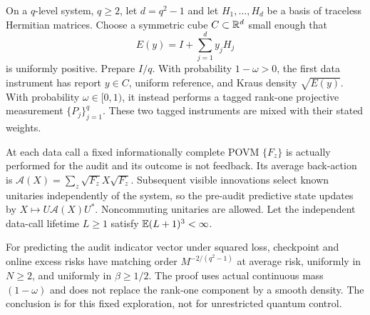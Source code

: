 \begin{theorem}\label{thm:quantum-geometry}
On a $q$-level system, $q\ge2$, let $d=q^2-1$ and let $H_1,\ldots,H_d$ be a basis of traceless Hermitian matrices. Choose a symmetric cube $C\subset\mathbb R^d$ small enough that
\[
 E(y)=I+\sum_{j=1}^dy_jH_j
\]
is uniformly positive. Prepare $I/q$. With probability $1-\omega>0$, the first data instrument has report $y\in C$, uniform reference, and Kraus density $\sqrt{E(y)}$. With probability $\omega\in[0,1)$, it instead performs a tagged rank-one projective measurement $\{P_j\}_{j=1}^q$. These two tagged instruments are mixed with their stated weights.

At each data call a fixed informationally complete POVM $\{F_z\}$ is actually performed for the audit and its outcome is not feedback. Its average back-action is $\mathcal A(X)=\sum_z\sqrt{F_z}X\sqrt{F_z}$. Subsequent visible innovations select known unitaries independently of the system, so the pre-audit predictive state updates by $X\mapsto U\mathcal A(X)U^*$. Noncommuting unitaries are allowed. Let the independent data-call lifetime $L\ge1$ satisfy $\mathbb E(L+1)^3<\infty$.

For predicting the audit indicator vector under squared loss, checkpoint and online excess risks have matching order $M^{-2/(q^2-1)}$ at average risk, uniformly in $N\ge2$, and uniformly in $\beta\ge1/2$. The proof uses actual continuous mass $(1-\omega)$ and does not replace the rank-one component by a smooth density. The conclusion is for this fixed exploration, not for unrestricted quantum control.
\end{theorem}
